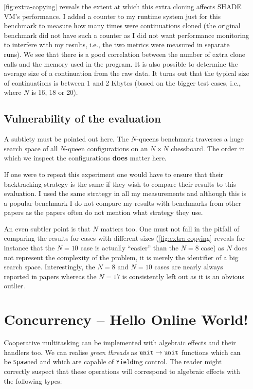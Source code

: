 \documentclass[class=article, crop=false]{standalone}
\begin{document}
\autoref{fig:extra-copying} reveals the extent at which this extra cloning
affects SHADE VM's performance. I added a counter to my runtime system just for
this benchmark to measure how many times were continuations cloned (the original
benchmark did not have such a counter as I did not want performance monitoring
to interfere with my results, i.e., the two metrics were measured in separate
runs). We see that there is a good correlation between the number of extra
clone calls and the memory used in the program. It is also possible to determine
the average size of a continuation from the raw data. It turns out that the typical
size of continuations is between 1 and 2 Kbytes (based on the bigger test cases, i.e.,
where $N$ is 16, 18 or 20).

\subsection{Vulnerability of the evaluation}

A subtlety must be pointed out here. The $N$-queens benchmark traverses a huge
search space of all $N$-queen configurations on an $N\times N$ chessboard. The
order in which we inspect the configurations \textbf{does} matter here.

If one were to repeat this experiment one would have to ensure that their
backtracking strategy is the same if they wish to compare their results to this
evaluation. I used the same strategy in all my measurements and although this is
a popular benchmark I do not compare my results with benchmarks from other papers
as the papers often do not mention what strategy they use.

An even subtler point is that $N$ matters too. One must not fall in the pitfall
of comparing the results for cases with different sizes (\autoref{fig:extra-copying}
reveals for instance that the $N=10$ case is actually ``easier'' than the $N=8$
case) as $N$ does not represent the complexity of the problem, it is merely the
identifier of a big search space. Interestingly, the $N=8$ and $N=10$ cases are
nearly always reported in papers whereas the $N=17$ is consistently left out as
it is an obvious outlier.

\section{Concurrency -- Hello Online World!}

Cooperative multitasking can be implemented with algebraic effects and their
handlers too. We can realise \emph{green threads} as $\mathtt{unit} \to \mathtt{unit}$
functions which can be \lstinline|Spawn|ed and which are capable
of \lstinline|Yield|ing control. The reader might correctly suspect that
these operations will correspond to algebraic effects with the following types:
\end{document}
